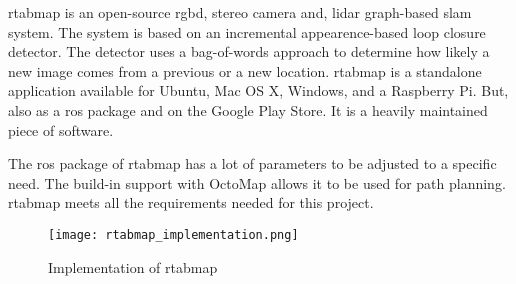 \acs{rtabmap} is an open\hyp{}source \acs{rgbd}, stereo camera and, \acs{lidar} graph\hyp{}based \acs{slam} system. The system is based on an incremental appearence\hyp{}based loop closure detector. The detector uses a bag\hyp{}of\hyp{}words approach to determine how likely a new image comes from a previous or a new location. \acs{rtabmap} is a standalone application available for Ubuntu, Mac OS X, Windows, and a Raspberry Pi. But, also as a \acs{ros} package and on the Google Play Store. It is a heavily maintained piece of software. \cite{rtabmap_introlab}

The \acs{ros} package of \acs{rtabmap} has a lot of parameters to be adjusted to a specific need. The build\hyp{}in support with OctoMap allows it to be used for path planning. \acs{rtabmap} meets all the requirements needed for this project.

\begin{figure}[!h]
  \centering
  \texttt{[image: rtabmap\_implementation.png]}
  \caption{Implementation of \acs{rtabmap}}
  \label{fig:rtabmap_implementation}
\end{figure}